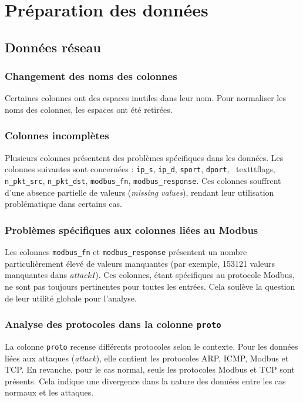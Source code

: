 \section{Préparation des données}

\subsection{Données réseau}

\subsubsection*{Changement des noms des colonnes}

Certaines colonnes ont des espaces inutiles dans leur nom. Pour normaliser les noms des colonnes, les espaces ont été retirées.

\subsubsection*{Colonnes incomplètes}
Plusieurs colonnes présentent des problèmes spécifiques dans les données. Les colonnes suivantes sont concernées : \texttt{ip\_s}, \texttt{ip\_d}, \texttt{sport}, \texttt{dport}, \    texttt{flags}, \texttt{n\_pkt\_src}, \texttt{n\_pkt\_dst}, \texttt{modbus\_fn}, \texttt{modbus\_response}. Ces colonnes souffrent d'une absence partielle de valeurs (\textit{missing values}), rendant leur utilisation problématique dans certains cas.

\subsubsection*{Problèmes spécifiques aux colonnes liées au Modbus}
Les colonnes \texttt{modbus\_fn} et \texttt{modbus\_response} présentent un nombre particulièrement élevé de valeurs manquantes (par exemple, 153121 valeurs manquantes dans \textit{attack1}). Ces colonnes, étant spécifiques au protocole Modbus, ne sont pas toujours pertinentes pour toutes les entrées. Cela soulève la question de leur utilité globale pour l'analyse.

\subsubsection*{Analyse des protocoles dans la colonne \texttt{proto}}
La colonne \texttt{proto} recense différents protocoles selon le contexte. Pour les données liées aux attaques (\textit{attack}), elle contient les protocoles ARP, ICMP, Modbus et TCP. En revanche, pour le cas normal, seuls les protocoles Modbus et TCP sont présents. Cela indique une divergence dans la nature des données entre les cas normaux et les attaques.

